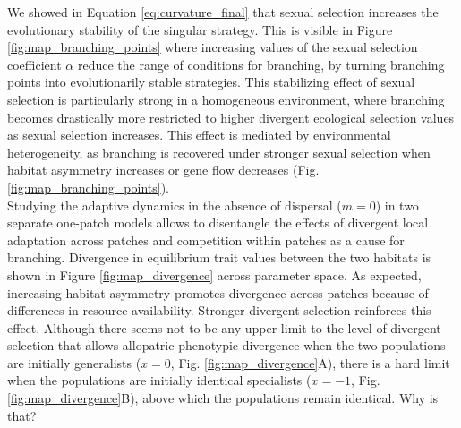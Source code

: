 We showed in Equation \ref{eq:curvature_final} that sexual selection increases the evolutionary stability of the singular strategy. This is visible in Figure \ref{fig:map_branching_points} where increasing values of the sexual selection coefficient $\alpha$ reduce the range of conditions for branching, by turning branching points into evolutionarily stable strategies. This stabilizing effect of sexual selection is particularly strong in a homogeneous environment, where branching becomes drastically more restricted to higher divergent ecological selection values as sexual selection increases. This effect is mediated by environmental heterogeneity, as branching is recovered under stronger sexual selection when habitat asymmetry increases or gene flow decreases (Fig. \ref{fig:map_branching_points}).\\

Studying the adaptive dynamics in the absence of dispersal ($m = 0$) in two separate one-patch models allows to disentangle the effects of divergent local adaptation across patches and competition within patches as a cause for branching. Divergence in equilibrium trait values between the two habitats is shown in Figure \ref{fig:map_divergence} across parameter space. As expected, increasing habitat asymmetry promotes divergence across patches because of differences in resource availability. Stronger divergent selection reinforces this effect. Although there seems not to be any upper limit to the level of divergent selection that allows allopatric phenotypic divergence when the two populations are initially generalists ($x = 0$, Fig. \ref{fig:map_divergence}A), there is a hard limit when the populations are initially identical specialists ($x = -1$, Fig. \ref{fig:map_divergence}B), above which the populations remain identical. Why is that?\\

